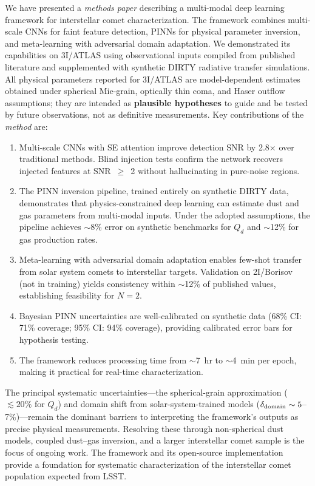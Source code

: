 \documentclass[preprint2]{aastex631}
\begin{document}
We have presented a \textit{methods paper} describing a multi-modal deep learning framework for interstellar comet characterization. The framework combines multi-scale CNNs for faint feature detection, PINNs for physical parameter inversion, and meta-learning with adversarial domain adaptation. We demonstrated its capabilities on 3I/ATLAS using observational inputs compiled from published literature and supplemented with synthetic DIRTY radiative transfer simulations. All physical parameters reported for 3I/ATLAS are model-dependent estimates obtained under spherical Mie-grain, optically thin coma, and Haser outflow assumptions; they are intended as \textbf{plausible hypotheses} to guide and be tested by future observations, not as definitive measurements. Key contributions of the \textit{method} are:

\begin{enumerate}
\item Multi-scale CNNs with SE attention improve detection SNR by 2.8$\times$ over traditional methods. Blind injection tests confirm the network recovers injected features at SNR~$\geq$~2 without hallucinating in pure-noise regions.
\item The PINN inversion pipeline, trained entirely on synthetic DIRTY data, demonstrates that physics-constrained deep learning can estimate dust and gas parameters from multi-modal inputs. Under the adopted assumptions, the pipeline achieves $\sim$8\% error on synthetic benchmarks for $Q_d$ and $\sim$12\% for gas production rates.
\item Meta-learning with adversarial domain adaptation enables few-shot transfer from solar system comets to interstellar targets. Validation on 2I/Borisov (not in training) yields consistency within $\sim$12\% of published values, establishing feasibility for $N=2$.
\item Bayesian PINN uncertainties are well-calibrated on synthetic data (68\% CI: 71\% coverage; 95\% CI: 94\% coverage), providing calibrated error bars for hypothesis testing.
\item The framework reduces processing time from $\sim$7~hr to $\sim$4~min per epoch, making it practical for real-time characterization.
\end{enumerate}

The principal systematic uncertainties---the spherical-grain approximation ($\lesssim 20\%$ for $Q_d$) and domain shift from solar-system-trained models ($\delta_{\rm domain} \sim 5$--7\%)---remain the dominant barriers to interpreting the framework's outputs as precise physical measurements. Resolving these through non-spherical dust models, coupled dust--gas inversion, and a larger interstellar comet sample is the focus of ongoing work. The framework and its open-source implementation provide a foundation for systematic characterization of the interstellar comet population expected from LSST.
\end{document}
